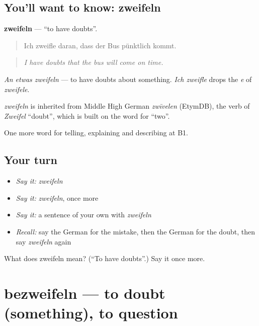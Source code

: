 \subsection*{You'll want to know: zweifeln}
\textbf{zweifeln} — \textquotedblleft{}to have doubts\textquotedblright{}.

\begin{quote}
Ich zweifle daran, dass der Bus pünktlich kommt.
\end{quote}

\begin{quote}
\emph{I have doubts that the bus will come on time.}
\end{quote}

\emph{An etwas zweifeln} — to have doubts about something. \emph{Ich zweifle} drops the \emph{e} of \emph{zweifele}.

\begin{cousinweb}
\emph{zweifeln} is inherited from Middle High German \emph{zwīvelen} (EtymDB), the verb of \emph{Zweifel} \textquotedblleft{}doubt\textquotedblright{}, which is built on the word for \textquotedblleft{}two\textquotedblright{}.
\end{cousinweb}

\begin{grammarlens}[title={What you've built}]
One more word for telling, explaining and describing at B1.
\end{grammarlens}

\subsection*{Your turn}
\begin{itemize}
\raggedright
  \item \emph{Say it:} \emph{zweifeln}
  \item \emph{Say it:} \emph{zweifeln}, once more
  \item \emph{Say it:} a sentence of your own with \emph{zweifeln}
  \item \emph{Recall:} say the German for the mistake, then the German for the doubt, then say \emph{zweifeln} again
\end{itemize}

\begin{tcolorbox}[breakable,colback=teal!4,colframe=teal!35!black,title={Before you move on}]
What does zweifeln mean? (\textquotedblleft{}To have doubts\textquotedblright{}.) Say it once more.
\end{tcolorbox}
\section[bezweifeln]{bezweifeln — to doubt (something), to question}

